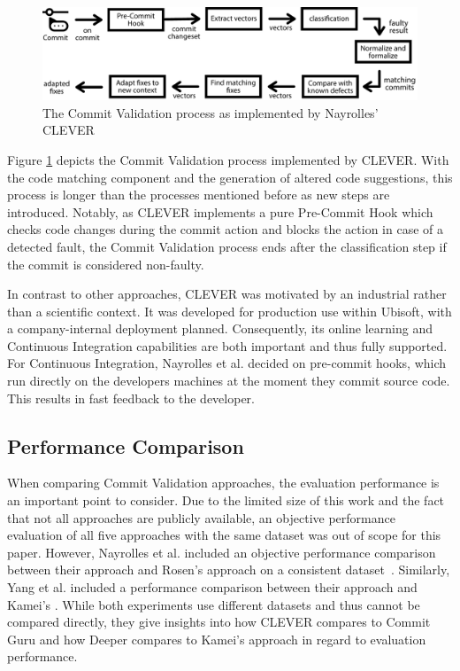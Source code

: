 \begin{figure}[t]
	\centering
	\includegraphics[width=\textwidth]{images/commitvalidation-process/cleverprocess-pdf}
	\caption{The Commit Validation process as implemented by Nayrolles' CLEVER \cite{Nayrolles2018}}
	\label{fig:cvprocess-clever}
\end{figure}

Figure \ref{fig:cvprocess-clever} depicts the Commit Validation process implemented by CLEVER. With the code matching component and the generation of altered code suggestions, this process is longer than the processes mentioned before as new steps are introduced. Notably, as CLEVER implements a pure Pre-Commit Hook which checks code changes during the commit action and blocks the action in case of a detected fault, the Commit Validation process ends after the classification step if the commit is considered non-faulty.

In contrast to other approaches, CLEVER was motivated by an industrial rather than a scientific context. It was developed for production use within Ubisoft, with a company-internal deployment planned. Consequently, its online learning and Continuous Integration capabilities are both important and thus fully supported. For Continuous Integration, Nayrolles et al. decided on pre-commit hooks, which run directly on the developers machines at the moment they commit source code. This results in fast feedback to the developer.

\subsection{Performance Comparison}
\label{sec:performance}

When comparing Commit Validation approaches, the evaluation performance is an important point to consider. Due to the limited size of this work and the fact that not all approaches are publicly available, an objective performance evaluation of all five approaches with the same dataset was out of scope for this paper. However, Nayrolles et al. included an objective performance comparison between their approach and Rosen's approach on a consistent dataset~\cite{Nayrolles2018}. 
Similarly, %
Yang et al. included a performance comparison between their approach and Kamei's \cite{Yang2015}. While both experiments use different datasets and thus cannot be compared directly, they give insights into how CLEVER compares to Commit Guru and how Deeper compares to Kamei's approach in regard to evaluation performance.

